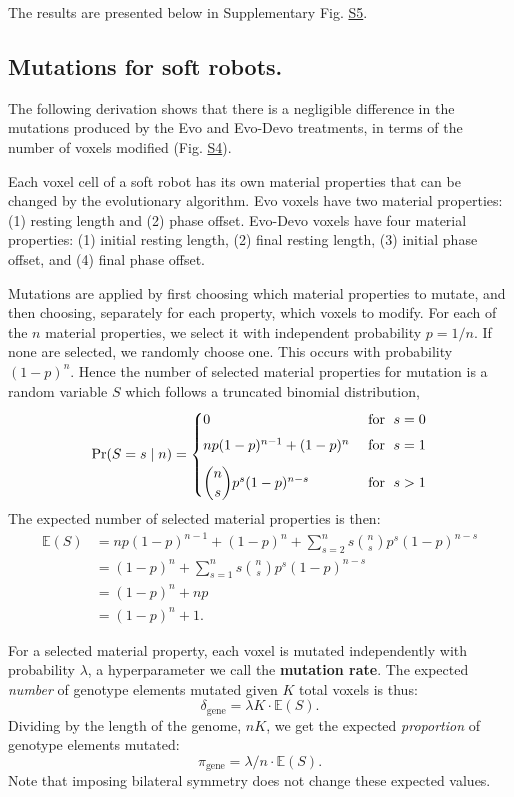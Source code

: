The results are presented below in Supplementary Fig. \hyperref[fig:S5]{S5}.


\subsection*{Mutations for soft robots.}

The following derivation shows that there is a negligible difference in the mutations produced by the Evo and Evo-Devo treatments, in terms of the number of voxels modified (Fig. \hyperref[fig:S4]{S4}). 

Each voxel cell of a soft robot has its own material properties that can be changed by the evolutionary algorithm.
Evo voxels have two material properties: (1) resting length and (2) phase offset.
Evo-Devo voxels have four material properties: (1) initial resting length, (2) final resting length, (3) initial phase offset, and (4) final phase offset.


Mutations are applied by first choosing which material properties to mutate, and then choosing, separately for each property, which voxels to modify.
For each of the $n$ material properties, we select it with independent probability $p=1/n$. 
If none are selected, we randomly choose one. This occurs with probability $\left(1-p\right)^n$.
Hence the number of selected material properties for mutation is a random variable $S$ which follows a truncated binomial distribution,
\begin{equation}
\text{Pr}(S = s \mid n) = 
	\begin{cases} 
        0 & \text{ for } \;  s = 0 \\[4pt]
        n p(1-p)^{n-1} + (1-p)^n & \text{ for } \;  s = 1 \\[8pt]
        \dbinom{n}{s} p^s (1-p)^{n-s} & \text{ for } \;  s > 1
	\end{cases}
\end{equation}
The expected number of selected material properties is then:
\begin{align}
\mathbb{E}(S) 
&=
np(1-p)^{n-1} + (1-p)^n + \sum_{s=2}^n s \binom{n}{s} p^s (1-p)^{n-s} \\
&= 
(1-p)^n + \sum_{s=1}^n s \binom{n}{s} p^s (1-p)^{n-s} \\
&= 
(1-p)^n + np \\
&= 
(1-p)^n+1 .
\end{align}


For a selected material property, 
each voxel is mutated independently with probability $\lambda$, a hyperparameter we call the \textbf{mutation rate}.
The expected \textit{number} of genotype elements mutated given $K$ total voxels is thus:
\begin{equation}
\delta_{\text{gene}} = \lambda K \cdot \mathbb{E}(S) .
\end{equation}
Dividing by the length of the genome, $nK$, we get the expected \textit{proportion} of genotype elements mutated:
\begin{equation}
\pi_{\text{gene}} = \lambda/n \cdot \mathbb{E}(S).
\end{equation}
Note that imposing bilateral symmetry does not change these expected values.

